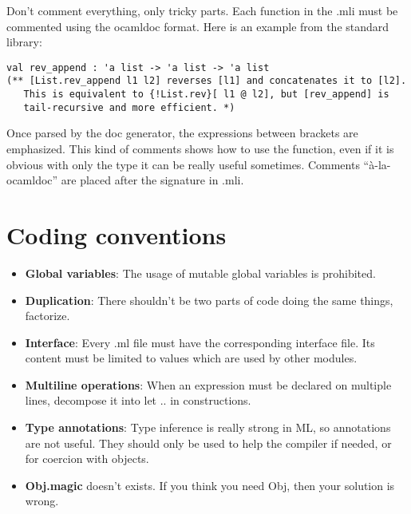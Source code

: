 \documentclass[12pt,a4paper]{article}
\begin{document}
Don't comment everything, only tricky parts. Each function in the .mli must be
commented using the ocamldoc format. Here is an example from the standard
library:

\begin{verbatim}
val rev_append : 'a list -> 'a list -> 'a list
(** [List.rev_append l1 l2] reverses [l1] and concatenates it to [l2].
   This is equivalent to {!List.rev}[ l1 @ l2], but [rev_append] is
   tail-recursive and more efficient. *)
\end{verbatim}

Once parsed by the doc generator, the expressions between brackets are
emphasized. This kind of comments shows how to use the function, even if it is
obvious with only the type it can be really useful sometimes. Comments
``à-la-ocamldoc'' are placed after the signature in .mli.

\section{Coding conventions}

\begin{itemize}
\item \textbf{Global variables}: The usage of mutable global variables is
  prohibited.
\item \textbf{Duplication}: There shouldn't be two parts of code doing the same
  things, factorize.
\item \textbf{Interface}: Every .ml file must have the corresponding interface
  file. Its content must be limited to values which are used by other
  modules. 
\item \textbf{Multiline operations}: When an expression must be declared on
  multiple lines, decompose it into \textsf{let .. in} constructions.
\item \textbf{Type annotations}: Type inference is really strong in ML, so
  annotations are not useful. They should only be used to help the compiler if
  needed, or for coercion with objects.
\item \textbf{Obj.magic} doesn't exists. If you think you need \textsf{Obj},
  then your solution is wrong.
\end{itemize}
\end{document}
